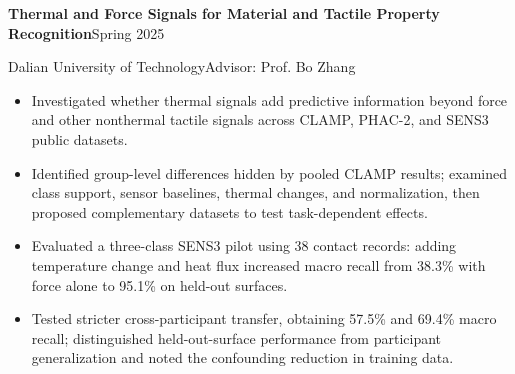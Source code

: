 \documentclass[10pt,letterpaper]{article}
\newcommand{\subentry}[2]{\vspace{4pt}\textbf{#1}\hfill #2\par}
\begin{document}
\subentry{Thermal and Force Signals for Material and Tactile Property Recognition}{Spring 2025}
Dalian University of Technology\hfill Advisor: Prof. Bo Zhang
\begin{itemize}
\item Investigated whether thermal signals add predictive information beyond force and other nonthermal tactile signals across CLAMP, PHAC-2, and SENS3 public datasets.
\item Identified group-level differences hidden by pooled CLAMP results; examined class support, sensor baselines, thermal changes, and normalization, then proposed complementary datasets to test task-dependent effects.
\item Evaluated a three-class SENS3 pilot using 38 contact records: adding temperature change and heat flux increased macro recall from 38.3\% with force alone to 95.1\% on held-out surfaces.
\item Tested stricter cross-participant transfer, obtaining 57.5\% and 69.4\% macro recall; distinguished held-out-surface performance from participant generalization and noted the confounding reduction in training data.
\end{itemize}
\newpage
\end{document}
